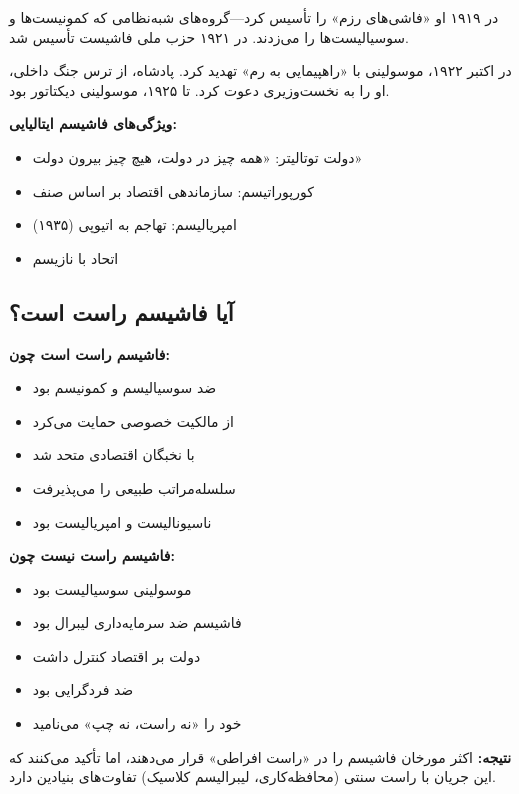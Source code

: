 در ۱۹۱۹ او «فاشی‌های رزم» را تأسیس کرد—گروه‌های شبه‌نظامی که کمونیست‌ها و سوسیالیست‌ها را می‌زدند. در ۱۹۲۱ حزب ملی فاشیست تأسیس شد.

در اکتبر ۱۹۲۲، موسولینی با «راهپیمایی به رم» تهدید کرد. پادشاه، از ترس جنگ داخلی، او را به نخست‌وزیری دعوت کرد. تا ۱۹۲۵، موسولینی دیکتاتور بود.

\textbf{ویژگی‌های فاشیسم ایتالیایی:}
\begin{itemize}
    \item دولت توتالیتر: «همه چیز در دولت، هیچ چیز بیرون دولت»
    \item کورپوراتیسم: سازماندهی اقتصاد بر اساس صنف
    \item امپریالیسم: تهاجم به اتیوپی (۱۹۳۵)
    \item اتحاد با نازیسم
\end{itemize}


\subsection{آیا فاشیسم راست است؟}

\begin{tcolorbox}[
    enhanced,
    colback=leftred!8,
    colframe=leftred,
    boxrule=1.5pt,
    arc=5pt,
    fonttitle=\bfseries,
    title={\rl{🔴 موضوع اختلافی: فاشیسم در کجای طیف؟}}
]

\textbf{فاشیسم راست است چون:}
\begin{itemize}
    \item ضد سوسیالیسم و کمونیسم بود
    \item از مالکیت خصوصی حمایت می‌کرد
    \item با نخبگان اقتصادی متحد شد
    \item سلسله‌مراتب طبیعی را می‌پذیرفت
    \item ناسیونالیست و امپریالیست بود
\end{itemize}



\textbf{فاشیسم راست نیست چون:}
\begin{itemize}
    \item موسولینی سوسیالیست بود
    \item فاشیسم ضد سرمایه‌داری لیبرال بود
    \item دولت بر اقتصاد کنترل داشت
    \item ضد فردگرایی بود
    \item خود را «نه راست، نه چپ» می‌نامید
\end{itemize}


\vspace{3mm}
\textbf{نتیجه:} اکثر مورخان فاشیسم را در «راست افراطی» قرار می‌دهند، اما تأکید می‌کنند که این جریان با راست سنتی (محافظه‌کاری، لیبرالیسم کلاسیک) تفاوت‌های بنیادین دارد.
\end{tcolorbox}

